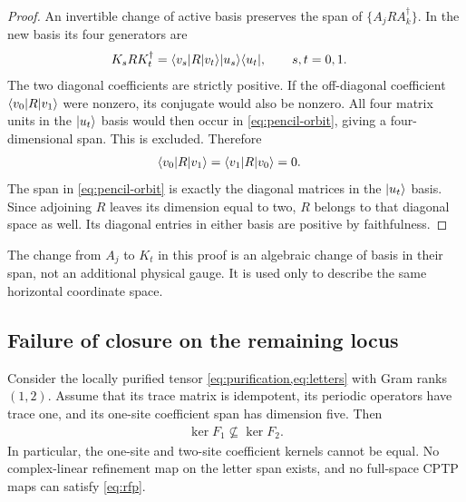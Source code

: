 \begin{proof}
	An invertible change of active basis preserves the span of
	$\{A_jRA_k^\dagger\}$. In the new basis its four generators are
	\begin{align}
		K_sRK_t^\dagger
		 & =\langle v_s\rvert R\lvert v_t\rangle\lvert u_s\rangle\langle u_t\rvert,
		\qquad s,t=0,1.
		\label{eq:pencil-orbit}
	\end{align}
	The two diagonal coefficients are strictly positive.
	If the off-diagonal coefficient $\langle v_0\rvert R\lvert v_1\rangle$ were nonzero,
	its conjugate would also be nonzero. All four matrix units in the
	$\lvert u_t\rangle$ basis would then occur in \cref{eq:pencil-orbit}, giving
	a four-dimensional span. This is excluded. Therefore
	\begin{align}
		\langle v_0\rvert R\lvert v_1\rangle
		 & =\langle v_1\rvert R\lvert v_0\rangle=0.
	\end{align}
	The span in \cref{eq:pencil-orbit} is exactly the diagonal matrices
	in the $\lvert u_t\rangle$ basis. Since adjoining $R$ leaves its dimension
	equal to two, $R$ belongs to that diagonal space as well.
	Its diagonal entries in either basis are positive by faithfulness.
\end{proof}

The change from $A_j$ to $K_t$ in this proof is an algebraic change
of basis in their span, not an additional physical gauge. It is
used only to describe the same horizontal coordinate space.

\subsection{Failure of closure on the remaining locus}

\begin{theorem}
	\label{thm:no-go}
	Consider the locally purified tensor
	\cref{eq:purification,eq:letters} with Gram ranks $(1,2)$.
	Assume that its trace matrix is idempotent, its periodic operators
	have trace one, and its one-site coefficient span has dimension five.
	Then
	\begin{align}
		\ker F_1\not\subseteq\ker F_2.
		\label{eq:no-kernel-inclusion}
	\end{align}
	In particular, the one-site and two-site coefficient kernels cannot
	be equal. No complex-linear refinement map on the letter span exists,
	and no full-space CPTP maps can satisfy \cref{eq:rfp}.
\end{theorem}

